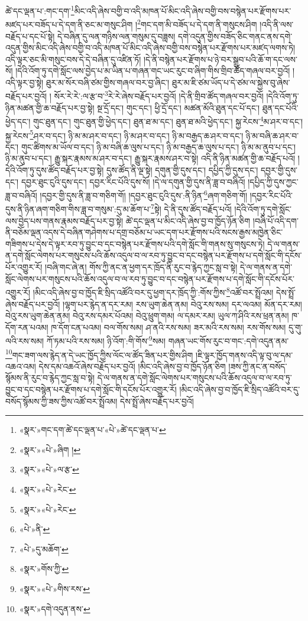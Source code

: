 ཚེ་དང་ལྡན་པ་:གང་དག་\footnote{«སྣར་»གང་དག་ཚེ་དང་ལྡན་པ་«པེ་»ཚེ་དང་ལྡན་པ་}མིང་འདི་ཞེས་བགྱི་བ་འདི་མཁན་པོ་མིང་འདི་ཞེས་བགྱི་བས་བསྙེན་པར་རྫོགས་པར་མཛད་པར་བཟོད་པ་དེ་དག་ནི་ཅང་མ་གསུང་ཤིག །\footnote{«སྣར་»«པེ་»ཞིག །}གང་དག་མི་བཟོད་པ་དེ་དག་ནི་གསུངས་ཤིག །འདི་ནི་ལས་བརྗོད་པ་དང་པོ་སྟེ། དེ་བཞིན་དུ་ལན་གཉིས་ལན་གསུམ་དུ་བཟླས། དགེ་འདུན་གྱིས་བཟོད་ཅིང་གནང་ནས་དགེ་འདུན་གྱིས་མིང་འདི་ཞེས་བགྱི་བ་འདི་མཁན་པོ་མིང་འདི་ཞེས་བགྱི་བས་བསྙེན་པར་རྫོགས་པར་མཛད་ལགས་ཏེ། འདི་ལྟར་ཅང་མི་གསུང་བས་དེ་དེ་བཞིན་དུ་འཛིན་ཏོ། །དེ་ནི་བསྙེན་པར་རྫོགས་པ་ཉེ་བར་སྒྲུབ་པའི་ཆོ་ག་དང་ལས་སོ། །དེའི་འོག་ཏུ་དགེ་སློང་ལས་བྱེད་པ་མ་ཡིན་པ་གཞན་གང་ཡང་རུང་བ་ཞིག་གིས་གྲིབ་ཚོད་གཞལ་བར་བྱའོ། །འདི་ལྟར་བྱ་སྟེ། ཐུར་མ་སོར་བཞི་ཙམ་གྱིས་གཞལ་བར་བྱ་ཞིང་། ཐུར་མ་ཇི་ཙམ་ཡོད་པ་དེ་ཙམ་ལ་སྐྱེས་བུ་ཞེས་བརྗོད་པར་བྱའོ། །
སོར་རེ་རེ་:ལ་རྩ་བ་\footnote{«སྣར་»«པེ་»ལ་རྩ་}རེ་རེ་ཞེས་བརྗོད་པར་བྱའོ། །དེ་ནི་གྲིབ་ཚོད་གཞལ་བར་བྱའོ། །དེའི་འོག་ཏུ་ཉིན་མཚན་གྱི་ཆ་བརྗོད་པར་བྱ་སྟེ། སྔ་དྲོ་དང་། གུང་དང་། ཕྱི་དྲོ་དང་། མཚན་མོའི་ཐུན་དང་པོ་དང་། ཐུན་དང་པོའི་ཕྱེད་དང་། གུང་ཐུན་དང་། གུང་ཐུན་གྱི་ཕྱེད་དང་། ཐུན་ཐ་མ་དང་། ཐུན་ཐ་མའི་ཕྱེད་དང་། སྐྱ་རེངས་\footnote{«སྣར་»«པེ་»རེང་}མ་ཤར་བ་དང་། སྐྱ་རེངས་\footnote{«སྣར་»«པེ་»རེང་}ཤར་བ་དང་། ཉི་མ་མ་ཤར་བ་དང་། ཉི་མ་ཤར་བ་དང་། ཉི་མ་བརྒྱད་ཆ་ཤར་བ་དང་། ཉི་མ་བཞི་ཆ་ཤར་བ་དང་། གུང་ཚིགས་མ་ཡོལ་བ་དང་། ཉི་མ་བཞི་ཆ་ལུས་པ་དང་། ཉི་མ་བརྒྱད་ཆ་ལུས་པ་དང་། ཉི་མ་མ་ནུབ་པ་དང་། ཉི་མ་ནུབ་པ་དང་། རྒྱུ་སྐར་རྣམས་མ་ཤར་བ་དང་། རྒྱུ་སྐར་རྣམས་ཤར་བ་སྟེ། འདི་ནི་ཉིན་མཚན་གྱི་ཆ་བརྗོད་པའོ། །དེའི་འོག་ཏུ་དུས་ཚོད་བརྗོད་པར་བྱ་སྟེ། དུས་ཚོད་ནི་ལྔ་སྟེ། དགུན་གྱི་དུས་དང་། དཔྱིད་ཀྱི་དུས་དང་། དབྱར་གྱི་དུས་དང་། དབྱར་ཐུང་ངུའི་དུས་དང་། དབྱར་རིང་པོའི་དུས་སོ། །དེ་ལ་དགུན་གྱི་དུས་ནི་ཟླ་བ་བཞིའོ། །དཔྱིད་ཀྱི་དུས་ཀྱང་ཟླ་བ་བཞིའོ། །དབྱར་གྱི་དུས་ནི་ཟླ་བ་གཅིག་གོ། །དབྱར་ཐུང་ངུའི་དུས་:ནི་ཉིན་\footnote{«པེ་»ནི་}ཞག་གཅིག་གོ། །དབྱར་རིང་པོའི་དུས་ནི་ཉིན་ཞག་གཅིག་གིས་ཟླ་བ་གསུམ་:དུ་མ་ཆོག་པ་\footnote{«པེ་»དུ་མཆོག་}སྟེ། དེ་ནི་དུས་ཚོད་བརྗོད་པའོ། །དེའི་འོག་ཏུ་དགེ་སློང་ལས་བྱེད་པས་གནས་རྣམས་བརྗོད་པར་བྱ་སྟེ། ཚེ་དང་ལྡན་པ་མིང་འདི་ཞེས་བྱ་བ་ཁྱོད་ཉོན་ཅིག །བཞི་པོ་འདི་དག་ནི་བཅོམ་ལྡན་འདས་དེ་བཞིན་གཤེགས་པ་དགྲ་བཅོམ་པ་ཡང་དག་པར་རྫོགས་པའི་སངས་རྒྱས་མཁྱེན་ཅིང་གཟིགས་པ་དེས་དེ་ལྟར་རབ་ཏུ་བྱུང་བ་དང་བསྙེན་པར་རྫོགས་པའི་དགེ་སློང་གི་གནས་སུ་གསུངས་ཏེ། དེ་ལ་གནས་ན་དགེ་སློང་ལེགས་པར་གསུངས་པའི་ཆོས་འདུལ་བ་ལ་རབ་ཏུ་བྱུང་བ་དང་བསྙེན་པར་རྫོགས་པ་དགེ་སློང་གི་དངོས་པོར་འགྱུར་རོ། །བཞི་གང་ཞེ་ན། གོས་ཀྱི་ནང་ན་ཕྱག་དར་ཁྲོད་ནི་རུང་བ་རྙེད་ཀྱང་སླ་བ་སྟེ། དེ་ལ་གནས་ན་དགེ་སློང་ལེགས་པར་གསུངས་པའི་ཆོས་འདུལ་བ་ལ་རབ་ཏུ་བྱུང་བ་དང་བསྙེན་པར་རྫོགས་པ་དགེ་སློང་གི་དངོས་པོར་འགྱུར་རོ། །མིང་འདི་ཞེས་བྱ་བ་ཁྱོད་ཇི་སྲིད་འཚོའི་བར་དུ་ཕྱག་དར་ཁྲོད་ཀྱི་:གོས་ཀྱིས་\footnote{«སྣར་»གོས་ཀྱི་}འཚོ་བར་སྤྲོའམ། དེས་སྤྲོ་ཞེས་བརྗོད་པར་བྱའོ། །ལྷག་པར་རྙེད་ན་དར་རམ། རས་ཡུག་ཆེན་ནམ། བེའུ་རས་སམ། དར་ལའམ། མོན་དར་རམ། བེའུ་རས་ཡུག་ཆེན་ནམ། བེའུ་རས་དམར་པོའམ། བེའུ་ཕྲུག་གམ། ལ་དམར་རམ། ཡུལ་ཀ་ཤིའི་རས་ཕྲན་ནམ། ཁ་དོག་རན་པའམ། ཁ་དོག་ངན་པའམ། བལ་གོས་སམ། ཤ་ནའི་རས་སམ། ཟར་མའི་རས་སམ། རས་གོས་སམ། དུ་གུ་ལའི་རས་སམ། ཀོ་ཏམ་པའི་རས་སམ། ཉི་འོག་:གི་གོས་\footnote{«སྣར་»«པེ་»གིས་རས་}སམ། གཞན་ཡང་གོས་རུང་བ་གང་:དགེ་འདུན་ནམ་\footnote{«སྣར་»དགེ་འདུན་ནས་}གང་ཟག་ལས་རྙེད་ན་དེ་ཡང་ཁྱོད་ཀྱིས་ལོང་ལ་ཚོད་ཟིན་པར་གྱིས་ཤིག །ཇི་ལྟར་ཁྱོད་གནས་འདི་ལྟ་བུ་ལ་དམ་འཆའ་འམ། དེས་དམ་འཆའོ་ཞེས་བརྗོད་པར་བྱའོ། །མིང་འདི་ཞེས་བྱ་བ་ཁྱོད་ཉོན་ཅིག །ཟས་ཀྱི་ནང་ན་བསོད་སྙོམས་ནི་རུང་བ་རྙེད་ཀྱང་སླ་བ་སྟེ། དེ་ལ་གནས་ན་དགེ་སློང་ལེགས་པར་གསུངས་པའི་ཆོས་འདུལ་བ་ལ་རབ་ཏུ་བྱུང་བ་དང་བསྙེན་པར་རྫོགས་པ་དགེ་སློང་གི་དངོས་པོར་འགྱུར་རོ། །མིང་འདི་ཞེས་བྱ་བ་ཁྱོད་ཇི་སྲིད་འཚོའི་བར་དུ་བསོད་སྙོམས་ཀྱི་ཟས་ཀྱིས་འཚོ་བར་སྤྲོའམ། དེས་སྤྲོ་ཞེས་བརྗོད་པར་བྱའོ། 